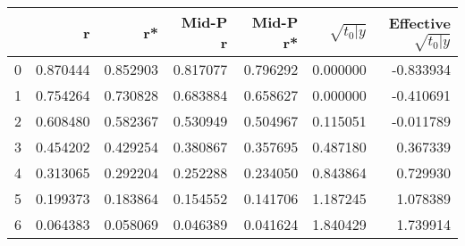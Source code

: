 \begin{tabular}{lrrrrrr}
\toprule
 & r & r* & Mid-P r & Mid-P r* & $\sqrt{t_0\vert y}$ & Effective $\sqrt{t_0\vert y}$ \\
\midrule
0 & 0.870444 & 0.852903 & 0.817077 & 0.796292 & 0.000000 & -0.833934 \\
1 & 0.754264 & 0.730828 & 0.683884 & 0.658627 & 0.000000 & -0.410691 \\
2 & 0.608480 & 0.582367 & 0.530949 & 0.504967 & 0.115051 & -0.011789 \\
3 & 0.454202 & 0.429254 & 0.380867 & 0.357695 & 0.487180 & 0.367339 \\
4 & 0.313065 & 0.292204 & 0.252288 & 0.234050 & 0.843864 & 0.729930 \\
5 & 0.199373 & 0.183864 & 0.154552 & 0.141706 & 1.187245 & 1.078389 \\
6 & 0.064383 & 0.058069 & 0.046389 & 0.041624 & 1.840429 & 1.739914 \\
\bottomrule
\end{tabular}
